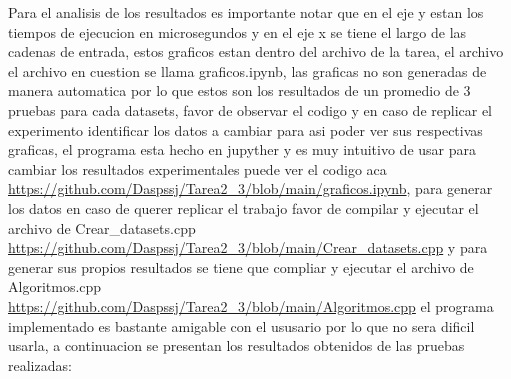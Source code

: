 Para el analisis de los resultados es importante notar que en el eje y estan los tiempos de ejecucion en microsegundos
y en el eje x se tiene el largo de las cadenas de entrada, estos graficos estan dentro del archivo de la tarea, el archivo
el archivo en cuestion se llama graficos.ipynb, las graficas no son generadas de manera automatica por lo que estos son los resultados
de un promedio de 3 pruebas para cada datasets, favor de observar el codigo y en caso de replicar el experimento identificar los
datos a cambiar para asi poder ver sus respectivas graficas, el programa esta hecho en jupyther y es muy intuitivo de usar para cambiar
los resultados experimentales puede ver el codigo aca \url{https://github.com/Daspssj/Tarea2_3/blob/main/graficos.ipynb}, para 
generar los datos en caso de querer replicar el trabajo favor de compilar y ejecutar el archivo de Crear\_datasets.cpp 
\url{https://github.com/Daspssj/Tarea2_3/blob/main/Crear_datasets.cpp} y para generar sus propios resultados se tiene que compliar
y ejecutar el archivo de Algoritmos.cpp \url{https://github.com/Daspssj/Tarea2_3/blob/main/Algoritmos.cpp} el programa implementado es
bastante amigable con el ususario por lo que no sera dificil usarla, a continuacion se presentan los resultados obtenidos de las pruebas realizadas:

